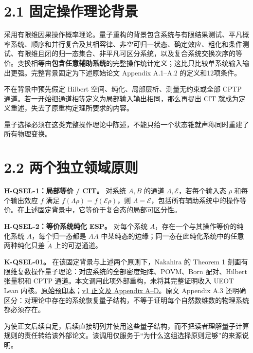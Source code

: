 \documentclass[
  11pt,
  oneside]{book}
\begin{document}
\hypertarget{ux56faux5b9aux64cdux4f5cux7406ux8bbaux80ccux666f}{%
\section{2.1
固定操作理论背景}\label{ux56faux5b9aux64cdux4f5cux7406ux8bbaux80ccux666f}}

采用有限维因果操作概率理论。量子重构的背景包含系统与有限结果测试、平凡概率系统、顺序和并行复合及其相容律、非空可归一状态、确定效应、粗化和条件测试、有限维且闭的归一态集合、非平凡可区分系统，以及复合系统交换次序的等价。变换相等由\textbf{包含任意辅助系统}的完整操作统计定义；这比只比较单系统输入输出更强。完整背景固定为下述原始论文
Appendix A.1--A.2 的定义和12项条件。

不在背景中预先假定 Hilbert 空间、纯化、局部层析、测量无约束或全部 CPTP
通道。若一开始把通道相等定义为局部输入输出相同，那么再提出 CIT
就成为定义重述，失去了原重构定理所要求的内容。

量子选择必须在这类完整操作理论中陈述，不能只给一个状态锥就声称同时重建了所有物理变换。

\hypertarget{ux4e24ux4e2aux72ecux7acbux9886ux57dfux539fux5219}{%
\section{2.2
两个独立领域原则}\label{ux4e24ux4e2aux72ecux7acbux9886ux57dfux539fux5219}}

\textbf{H-QSEL-1：局部等价 / CIT。} 对系统 \(A,B\) 的通道
\(\Lambda,\mathcal E\)，若每个输入态 \(\rho\) 和每个输出效应 \(f\) 满足
\(f(\Lambda\rho)=f(\mathcal E\rho)\)，则
\(\Lambda=\mathcal E\)，包括所有辅助系统中的操作等价。在上述固定背景中，它等价于复合态的局部可区分性。

\textbf{H-QSEL-2：等价系统纯化 ESP。} 对每个系统
\(A\)，存在一个与其操作等价的纯化系统 \(\widetilde A\)，每个归一态都是
\(A\widetilde A\) 中某纯态的边缘；同一态在此纯化系统中的任意两种纯化只差
\(\widetilde A\) 上的可逆通道。

\textbf{K-QSEL-01。} 在该固定背景与上述两个原则下，Nakahira 的 Theorem 1
刻画有限维复数操作量子理论：对应系统的全部密度矩阵、POVM、Born
配对、Hilbert 张量积和 CPTP
通道。本文调用此项外部重构，未将其完整证明收入 UEOT Lean
内核。\href{https://arxiv.org/abs/2605.23217}{原始预印本}；\href{https://arxiv.org/html/2605.23217v1}{v1
正文及 Appendix A--D}。原文 Appendix A.3
还明确区分：对理论中存在的系统恢复量子结构，不等于证明每个自然数维数的物理系统都必须存在。

为使正文后续自足，后续直接明列并使用这些量子结构，而不把读者理解量子计算规则的责任转给该外部论文。该调用仅服务于``为什么这组选择原则足够''的来源说明。
\end{document}
